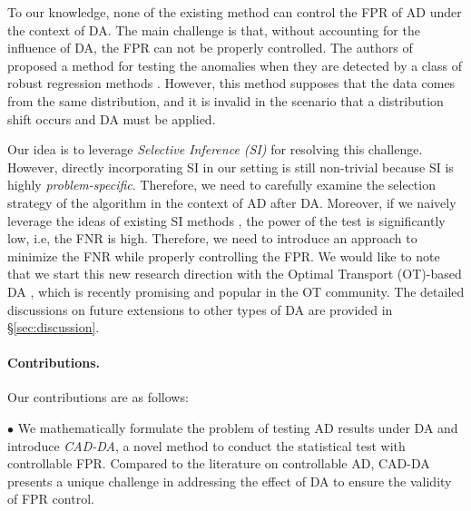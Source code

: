 To our knowledge, none of the existing method can control the FPR of AD under the context of DA.
%
The main challenge is that, without accounting for the influence of DA, the FPR can not be properly controlled.
%
%
The authors of \cite{tsukurimichi2022conditional} proposed a method for testing the anomalies when they are detected by a class of robust regression methods \cite{huber1973robust, andrews1974robust, zaman2001econometric, rousseeuw2005robust, maronna2019robust}.
%
However, this method supposes that the data comes from the same distribution, and it is invalid in the scenario that a distribution shift occurs and DA must be applied.



Our idea is to leverage \emph{Selective Inference (SI)} \cite{lee2016exact} for resolving this challenge.
%
However, directly incorporating SI in our setting is still non-trivial because SI is highly \emph{problem-specific}.
%
Therefore, we need to carefully examine the selection strategy of the algorithm in the context of AD after DA.
%
Moreover, if we naively leverage the ideas of existing SI methods \cite{lee2016exact, duy2021exact}, the power of the test is significantly low, i.e, the FNR is high.
%
Therefore, we need to introduce an approach to minimize the FNR while properly controlling the FPR.
%
We would like to note that we start this new research direction with the Optimal Transport (OT)-based DA \cite{flamary2016optimal}, which is recently promising and popular in the OT community. The detailed discussions on future extensions to other types of DA are provided in \S \ref{sec:discussion}.


\paragraph{Contributions.} Our contributions are as follows:

$\bullet$ We mathematically formulate the problem of testing AD results under DA and introduce \emph{CAD-DA}, a novel method to conduct the statistical test with controllable FPR. 
%
Compared to the literature on controllable AD, CAD-DA presents a unique challenge in addressing the effect of DA to ensure the validity of FPR control.



